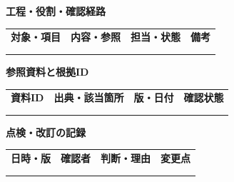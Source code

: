 \documentclass[11pt,a4paper]{article}
\begin{document}
\par{}\noindent\textbf{工程・役割・確認経路}\par\vspace{1mm}
{\fontsize{8.5}{13}\selectfont
\begin{tabularx}{\linewidth}{@{}XXXX@{}}
\textbf{対象・項目} & \textbf{内容・参照} & \textbf{担当・状態} & \textbf{備考}\\[2mm]
\strut & \strut & \strut & \strut\\[5mm]
\strut & \strut & \strut & \strut\\[5mm]
\end{tabularx}
}\vspace{2mm}\par
{}
\par{}\noindent\textbf{参照資料と根拠ID}\par\vspace{1mm}
{\fontsize{8.5}{13}\selectfont
\begin{tabularx}{\linewidth}{@{}XXXX@{}}
\textbf{資料ID} & \textbf{出典・該当箇所} & \textbf{版・日付} & \textbf{確認状態}\\[2mm]
\strut & \strut & \strut & \strut\\[5mm]
\strut & \strut & \strut & \strut\\[5mm]
\end{tabularx}
}\vspace{2mm}\par
{}
\par{}\noindent\textbf{点検・改訂の記録}\par\vspace{1mm}
{\fontsize{8.5}{13}\selectfont
\begin{tabularx}{\linewidth}{@{}XXXX@{}}
\textbf{日時・版} & \textbf{確認者} & \textbf{判断・理由} & \textbf{変更点}\\[2mm]
\strut & \strut & \strut & \strut\\[5mm]
\strut & \strut & \strut & \strut\\[5mm]
\end{tabularx}
}\vspace{2mm}\par
\end{document}

